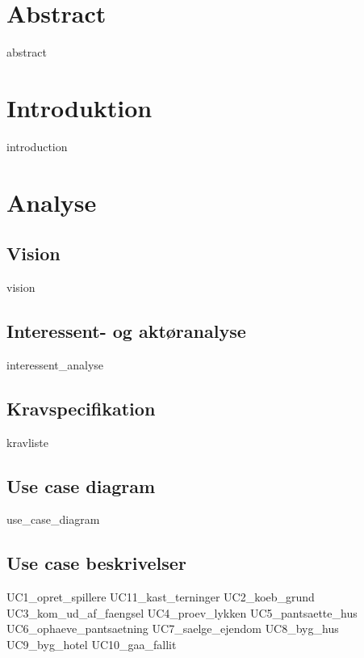 \documentclass{article}
\begin{document}
{\selectfont

\thispagestyle{empty}
\newpage

\thispagestyle{empty}
\newpage
\section*{Abstract}
{abstract}
\thispagestyle{empty}
\newpage
\tableofcontents
\thispagestyle{empty}
\newpage
\clearpage
\setcounter{page}{1}

\section{Introduktion}
{introduction}

\section{Analyse}
\subsection{Vision}
{vision}

\subsection{Interessent- og aktøranalyse}
{interessent_analyse}
\subsection{Kravspecifikation}
{kravliste}
\newpage
\subsection{Use case diagram}
{use_case_diagram}
\newpage
\subsection{Use case beskrivelser}
{UC1_opret_spillere}
{UC11_kast_terninger}
{UC2_koeb_grund}
{UC3_kom_ud_af_faengsel}
{UC4_proev_lykken}
{UC5_pantsaette_hus}
{UC6_ophaeve_pantsaetning}
{UC7_saelge_ejendom}
{UC8_byg_hus}
{UC9_byg_hotel}
{UC10_gaa_fallit}
\newpage
}
\end{document}
